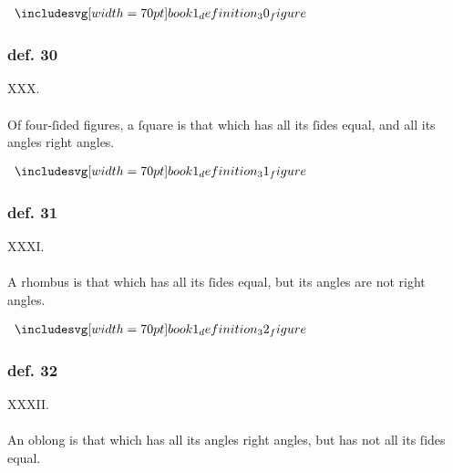 \hfill

\begin{minipage}{0.33\textwidth}
    \begin{center}
        $\img[0][0][70]{book1_definition_30_figure}$
    \end{center}
\end{minipage}%
\begin{minipage}{0.67\textwidth}
    \subsubsection{def. 30}
    \begin{center}
        XXX.\label{book1def30}\\
        \hfill\\
        Of four-ſided figures, a ſquare is that which has all its ſides equal, and all its angles right angles.
    \end{center}
\end{minipage}

\hfill

\begin{minipage}{0.33\textwidth}
    \begin{center}
        $\img[0][0][70]{book1_definition_31_figure}$
    \end{center}
\end{minipage}%
\begin{minipage}{0.67\textwidth}
    \subsubsection{def. 31}
    \begin{center}
        XXXI.\label{book1def31}\\
        \hfill\\
        A rhombus is that which has all its ſides equal, but its angles are not right angles.
    \end{center}
\end{minipage}

\hfill

\begin{minipage}{0.33\textwidth}
    \begin{center}
        $\img[0][0][70]{book1_definition_32_figure}$
    \end{center}
\end{minipage}%
\begin{minipage}{0.67\textwidth}
    \subsubsection{def. 32}
    \begin{center}
        XXXII.\label{book1def32}\\
        \hfill\\
        An oblong is that which has all its angles right angles, but has not all its ſides equal.
    \end{center}
\end{minipage}

